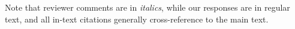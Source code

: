 \documentclass[11pt,letterpaper]{article}
\begin{document}



\nolinenumbers
\newpage
\setcounter{page}{1}
Note that reviewer comments are in \emph{italics}, while our responses are in regular text, and all in-text citations generally cross-reference to the main text.\\
\end{document}

